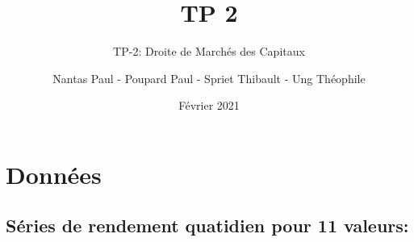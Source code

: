 \documentclass[
]{article}
\title{TP 2}
\subtitle{TP-2: Droite de Marchés des Capitaux}
\author{Nantas Paul - Poupard Paul - Spriet Thibault - Ung Théophile}
\date{Février 2021}
\newenvironment{Shaded}{\begin{snugshade}}{\end{snugshade}}
\newcommand{\DataTypeTok}[1]{\textcolor[rgb]{0.13,0.29,0.53}{#1}}
\newcommand{\KeywordTok}[1]{\textcolor[rgb]{0.13,0.29,0.53}{\textbf{#1}}}
\newcommand{\NormalTok}[1]{#1}
\newcommand{\OperatorTok}[1]{\textcolor[rgb]{0.81,0.36,0.00}{\textbf{#1}}}
\newcommand{\StringTok}[1]{\textcolor[rgb]{0.31,0.60,0.02}{#1}}
\begin{document}
\maketitle

\hypertarget{donnuxe9es}{%
\section{Données}\label{donnuxe9es}}

\hypertarget{suxe9ries-de-rendement-quatidien-pour-11-valeurs}{%
\subsection{Séries de rendement quatidien pour 11
valeurs:}\label{suxe9ries-de-rendement-quatidien-pour-11-valeurs}}

\begin{Shaded}
\end{Shaded}
\end{document}
